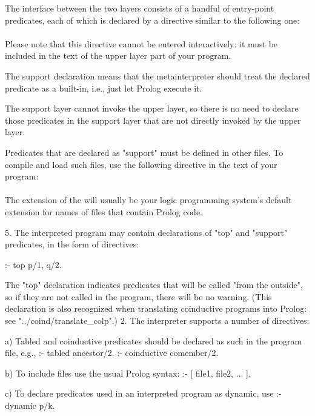 The interface between the two layers consists of a handful of entry-point
predicates, each of which is  declared by a directive similar to the
following one:\\
\ind{}\\
Please note that this directive cannot be entered interactively: it must be
included in the text of the upper layer part of your program.

The support declaration means that the metainterpreter should treat the
declared predicate as a built-in, i.e., just let Prolog execute it.

The support layer cannot invoke the upper layer, so there is no need to
declare those predicates in the support layer that are not directly invoked
by the upper layer.

Predicates that are declared as "support" must be defined in other files.  To
compile and load such files, use the following directive in the text of your
program:\\
\ind{}\\
The extension of the  will usually be your logic programming
system's default extension for names of files that contain Prolog code.



    5. The interpreted program may contain declarations of "top" and
       "support" predicates, in the form of directives:

           :- top p/1, q/2.


       The "top" declaration indicates predicates that will be called "from
       the outside", so if they are not called in the program, there will be
       no warning.
       (This declaration is also recognized when translating coinductive
        programs into Prolog: see "../coind/translate\_colp".)
    2. The interpreter supports a number of directives:

       a) Tabled and coinductive predicates should be declared as such in
          the program file, e.g.,
              :- tabled      ancestor/2.
              :- coinductive comember/2.

       b) To include files use the usual Prolog syntax:
              :- [ file1, file2, ... ].

       c) To declare predicates used in an interpreted program as dynamic,
          use
              :- dynamic p/k.

